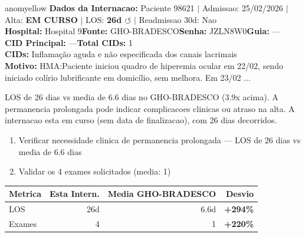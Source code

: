 \documentclass[a4paper,10pt]{article}
\begin{document}
\begin{anomalycard}[Internacao 118902 | GHO-BRADESCO | MODERADO (z=2.74)]{anomyellow}
\textbf{Dados da Internacao:} Paciente 98621 $\mid$ Admissao: 25/02/2026 $\mid$ Alta: \textcolor{anomorange}{\textbf{EM CURSO}} $\mid$ LOS: \textbf{26d \textcolor{anomorange}{$\circlearrowleft$}} $\mid$ Readmissao 30d: Nao\\
\textbf{Hospital:} Hospital 9\quad\textbf{Fonte:} GHO-BRADESCO\quad\textbf{Senha:} JZLN8W0\quad\textbf{Guia:} ---\\
\textbf{CID Principal:} {\small ---}\quad\textbf{Total CIDs:} 1\\

\textbf{CIDs:} {\scriptsize Inflamação aguda e não especificada dos canais lacrimais}\\

\textbf{Motivo:} {\scriptsize HMA:Paciente iniciou quadro de hiperemia ocular em 22/02, sendo iniciado colírio lubrificante em domicílio, sem melhora. Em 23/02 ...}\\

\vspace{2pt}\begin{tcolorbox}[colback=severityred!20,colframe=anomyellow,title={\textbf{Interpretacao de Negocio}},fonttitle=\bfseries\small,left=4pt,right=4pt,top=3pt,bottom=3pt]
{\small LOS de 26 dias vs media de 6.6 dias no GHO-BRADESCO (3.9x acima). A permanencia prolongada pode indicar complicacoes clinicas ou atraso na alta. A internacao esta em curso (sem data de finalizacao), com 26 dias decorridos.}
\end{tcolorbox}
\begin{tcolorbox}[colback=severityyellow!30,colframe=anomorange,title={\textbf{Recomendacoes Especificas}},fonttitle=\bfseries\small,left=4pt,right=4pt,top=3pt,bottom=3pt]
\begin{enumerate}[nosep,leftmargin=16pt]
\item {\small Verificar necessidade clinica de permanencia prolongada --- LOS de 26 dias vs media de 6.6 dias}
\item {\small Validar os 4 exames solicitados (media: 1)}
\end{enumerate}
\end{tcolorbox}
\begin{center}\begin{tabular}{l r r r}\toprule\textbf{Metrica} & \textbf{Esta Intern.} & \textbf{Media GHO-BRADESCO} & \textbf{Desvio} \\\midrule
LOS & 26d & 6.6d & \textcolor{anomred}{\textbf{+294\%}} \\
Exames & 4 & 1 & \textcolor{anomred}{\textbf{+220\%}} \\
\bottomrule\end{tabular}\end{center}


\end{anomalycard}
\end{document}
